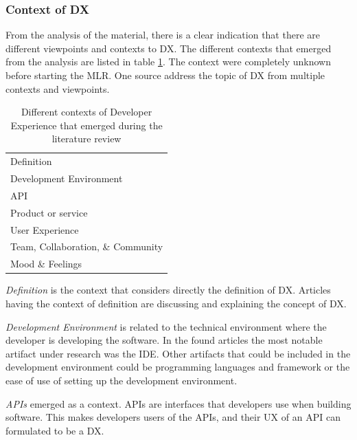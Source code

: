 \documentclass[english, 12pt, a4paper, sci, utf8, a-1b, online]{aaltothesis}
\begin{document}
\subsubsection{Context of DX}

From the analysis of the material, there is a clear indication that there are different viewpoints and contexts to DX. The different contexts that emerged from the analysis are listed in table \ref{table:contexts}. The context were completely unknown before starting the MLR. One source address the topic of DX from multiple contexts and viewpoints.

\begin{table}[ht]
  \begin{center}
    \begin{tabular}{l}
      \hline
      Definition                        \\
      Development Environment           \\
      API                               \\
      Product or service                \\
      User Experience                   \\
      Team, Collaboration, \& Community \\
      Mood \& Feelings                  \\
      \hline
    \end{tabular}
    \captionsetup{width=0.6\textwidth}
    \caption{Different contexts of Developer Experience that emerged during the literature review}
    \label{table:contexts}
  \end{center}
\end{table}

\textit{Definition} is the context that considers directly the definition of DX. Articles having the context of definition are discussing and explaining the concept of DX.

\textit{Development Environment} is related to the technical environment where the developer is developing the software. In the found articles the most notable artifact under research was the IDE. Other artifacts that could be included in the development environment could be programming languages and framework or the ease of use of setting up the development environment.

\textit{APIs} emerged as a context. APIs are interfaces that developers use when building software. This makes developers users of the APIs, and their UX of an API can formulated to be a DX.
\end{document}

